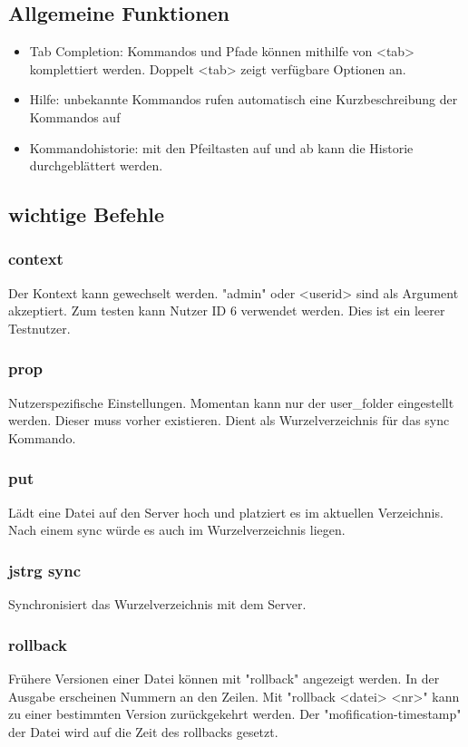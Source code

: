 \documentclass
[   oneside,         %
    12pt,            %
    DIV15,           %
    headsepline,     %
    footsepline,     %
    openright,       %
    a4paper,         %
    abstracton,      %
    titlepage,       %
    headinclude,     %
]   {scrreprt}       %
\begin{document}
	\subsection{Allgemeine Funktionen}
	\begin{itemize}
		\item Tab Completion: Kommandos und Pfade können mithilfe von <tab> komplettiert werden. Doppelt <tab> zeigt verfügbare Optionen an.
		\item Hilfe: unbekannte Kommandos rufen automatisch eine Kurzbeschreibung der Kommandos auf
		\item Kommandohistorie: mit den Pfeiltasten auf und ab kann die Historie durchgeblättert werden.
	\end{itemize}
	
	\subsection{wichtige Befehle}
	\subsubsection{context}
	Der Kontext kann gewechselt werden. "admin" oder <userid> sind als Argument akzeptiert. Zum testen kann Nutzer ID 6 verwendet werden. Dies ist ein leerer Testnutzer.
	\subsubsection{prop}
	Nutzerspezifische Einstellungen. Momentan kann nur der user\_folder eingestellt werden. Dieser muss vorher existieren. Dient als Wurzelverzeichnis für das sync Kommando.
	\subsubsection{put}
	Lädt eine Datei auf den Server hoch und platziert es im aktuellen Verzeichnis. Nach einem sync würde es auch im Wurzelverzeichnis liegen.
	\subsubsection{jstrg sync}
	Synchronisiert das Wurzelverzeichnis mit dem Server.
	\subsubsection{rollback}
	Frühere Versionen einer Datei können mit "rollback" angezeigt werden. In der Ausgabe erscheinen Nummern an den Zeilen. Mit "rollback <datei> <nr>" kann zu einer bestimmten Version zurückgekehrt werden. Der "mofification-timestamp" der Datei wird auf die Zeit des rollbacks gesetzt.
\end{document}
